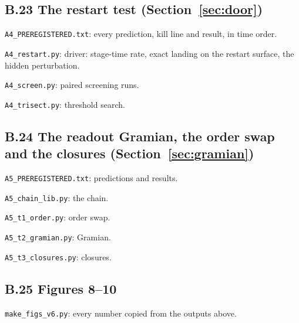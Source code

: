 \subsection*{B.23 The restart test (Section~\ref{sec:door})}
\noindent\texttt{A4\_PREREGISTERED.txt}: every prediction, kill line and result, in time order.

\noindent\texttt{A4\_restart.py}: driver: stage-time rate, exact landing on the restart surface, the hidden perturbation.

\noindent\texttt{A4\_screen.py}: paired screening runs.

\noindent\texttt{A4\_trisect.py}: threshold search.

\subsection*{B.24 The readout Gramian, the order swap and the closures (Section~\ref{sec:gramian})}
\noindent\texttt{A5\_PREREGISTERED.txt}: predictions and results.

\noindent\texttt{A5\_chain\_lib.py}: the chain.

\noindent\texttt{A5\_t1\_order.py}: order swap.

\noindent\texttt{A5\_t2\_gramian.py}: Gramian.

\noindent\texttt{A5\_t3\_closures.py}: closures.

\subsection*{B.25 Figures 8--10}
\noindent\texttt{make\_figs\_v6.py}: every number copied from the outputs above.

